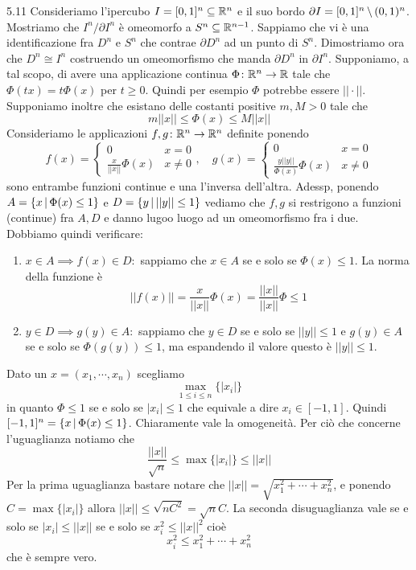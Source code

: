\documentclass[a4paper]{article}
\begin{document}
\begin{snippetexample}{5.11}
    Consideriamo l'ipercubo \(I = [0,1]^n \subseteq \mathbb{R}^n\)
    e il suo bordo \(\partial I = [0,1]^n \,\backslash\, (0,1)^n\).
    Mostriamo che \(I^n / \partial I^n\) è omeomorfo a \(S^n \subseteq \mathbb{R}^{n-1}\).
    Sappiamo che vi è una identificazione fra \(D^n\) e \(S^n\)
    che contrae \(\partial D^n\) ad un punto di \(S^n\).
    Dimostriamo ora che \(D^n \cong I^n\) costruendo un omeomorfismo
    che manda \(\partial D^n\) in \(\partial I^n\).
    Supponiamo, a tal scopo, di avere una applicazione continua
    \(\Phi \colon \mathbb{R}^n \to \mathbb{R}\)
    tale che \(\Phi(tx) = t\Phi(x)\) per \(t \geq 0\).
    Quindi per esempio \(\Phi\) potrebbe essere \(||\cdot||\).
    Supponiamo inoltre che esistano delle costanti positive \(m, M > 0\)
    tale che \[m||x|| \leq \Phi(x) \leq M||x||\]
    Consideriamo le applicazioni \(f,g \colon \mathbb{R}^n \to \mathbb{R}^n\)
    definite ponendo
    \[
        f(x) = \begin{cases}
            0 & x = 0 \\
            \frac{x}{||x||} \Phi(x) & x \neq 0
        \end{cases}, \quad
        g(x) = \begin{cases}
            0 & x = 0 \\
            \frac{y||y||}{\Phi(x)} \Phi(x) & x \neq 0
        \end{cases}
    \]
    sono entrambe funzioni continue e una l'inversa dell'altra.
    Adessp, ponendo \(A = \{x \,|\, \Phi(x) \leq 1\}\)
    e \(D = \{y \,|\, ||y|| \leq 1\}\)
    vediamo che \(f,g\) si restrigono a funzioni (continue)
    fra \(A, D\) e danno lugoo luogo ad un omeomorfismo fra i due.
    Dobbiamo quindi verificare:
    \begin{enumerate}
        \item \(x \in A \implies f(x) \in D:\) sappiamo che \(x \in A\) se e solo se \(\Phi(x) \leq 1\).
        La norma della funzione è
        \[
            ||f(x)|| = \frac{x}{||x||} \Phi(x) = \frac{||x||}{||x||} \Phi \leq 1
        \]
        \item \(y \in D \implies g(y) \in A:\) sappiamo che \(y\in D\)
        se e solo se \(||y|| \leq 1\) e \(g(y) \in A\) se e solo se \(\Phi(g(y)) \leq 1\),
        ma espandendo il valore questo è \(||y|| \leq 1\).
    \end{enumerate}
    Dato un \(x = (x_1, \cdots, x_n)\) scegliamo\[
        \max_{1 \leq i \leq n} \{|x_i|\}
    \]
    in quanto \(\Phi \leq 1\) se e solo se \(|x_i| \leq 1\)
    che equivale a dire \(x_i \in [-1, 1]\).
    Quindi \([-1, 1]^n = \{x \,|\, \Phi(x) \leq 1\}\).
    Chiaramente vale la omogeneità. Per ciò che concerne l'uguaglianza notiamo che
    \[
        \frac{||x||}{\sqrt{n}} \leq \max \{|x_i|\} \leq ||x||
    \]
    Per la prima uguaglianza bastare notare che \(||x|| = \sqrt{x_1^2 + \cdots + x_n^2}\),
    e ponendo \(C = \max \{|x_i|\}\) allora \(||x|| \leq \sqrt{nC^2} = \sqrt{n}C\).
    La seconda disuguaglianza vale se e solo se \(|x_i| \leq ||x||\)
    se e solo se \(x_i^2 \leq ||x||^2\) cioè
    \[
        x_i^2 \leq x_1^2 + \cdots + x_n^2
    \]
    che è sempre vero.
\end{snippetexample}
\end{document}
